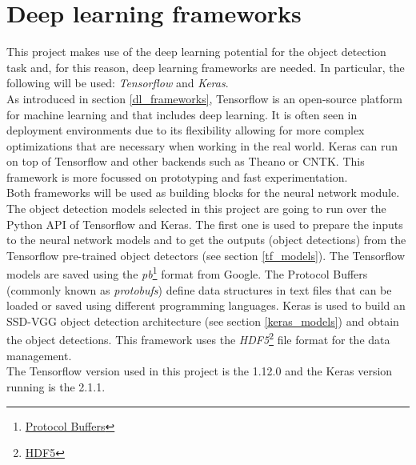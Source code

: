 \section{Deep learning frameworks}
This project makes use of the deep learning potential for the object detection task and, for this reason, deep learning frameworks are needed. In particular, the following will be used: \textit{Tensorflow} and \textit{Keras}.\\
As introduced in section \ref{dl_frameworks}, Tensorflow is an open-source platform for machine learning and that includes deep learning. It is often seen in deployment environments due to its flexibility allowing for more complex optimizations that are necessary when working in the real world. Keras can run on top of Tensorflow and other backends such as Theano or CNTK. This framework is more focussed on prototyping and fast experimentation.\\
Both frameworks will be used as building blocks for the neural network module. The object detection models selected in this project are going to run over the Python API of Tensorflow and Keras. The first one is used to prepare the inputs to the neural network models and to get the outputs (object detections) from the Tensorflow pre-trained object detectors (see section \ref{tf_models}). The Tensorflow models are saved using the \textit{pb}\footnote{\href{https://developers.google.com/protocol-buffers/?hl=en}{Protocol Buffers}} format from Google. The Protocol Buffers (commonly known as \textit{protobufs}) define data structures in text files that can be loaded or saved using different programming languages. Keras is used to build an SSD-VGG object detection architecture (see section \ref{keras_models}) and obtain the object detections. This framework uses the \textit{HDF5}\footnote{\href{https://www.hdfgroup.org/solutions/hdf5/}{HDF5}} file format for the data management.\\
The Tensorflow version used in this project is the 1.12.0 and the Keras version running is the 2.1.1.

